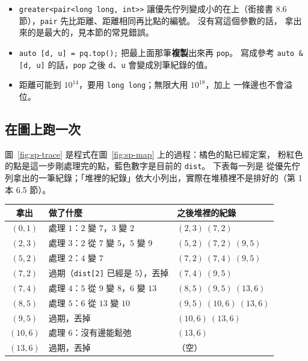 \begin{itemize}
\item \texttt{greater<pair<long long, int>>} 讓優先佇列變成小的在上（銜接書
8.6 節），\texttt{pair} 先比距離、距離相同再比點的編號。 沒有寫這個參數的話，
拿出來的是最大的，見本節的常見錯誤。
\item \texttt{auto [d, u] = pq.top();} 把最上面那筆\textbf{複製}出來再
\texttt{pop}。 寫成參考 \texttt{auto \&[d, u]} 的話，\texttt{pop} 之後
\texttt{d}、\texttt{u} 會變成別筆紀錄的值。
\item 距離可能到 $10^{14}$，要用 \texttt{long long}；無限大用 $10^{18}$，加上
一條邊也不會溢位。
\end{itemize}

\subsection{在圖上跑一次}

圖~\ref{fig:sp-trace} 是程式在圖~\ref{fig:sp-map} 上的過程：橘色的點已經定案，
粉紅色的點是這一步剛處理完的點，藍色數字是目前的 \texttt{dist}。 下表每一列是
從優先佇列拿出的一筆紀錄；「堆裡的紀錄」依大小列出，實際在堆積裡不是排好的（第
1 本 6.5 節）。

\begin{center}
\begin{tabular}{cll}
\toprule
拿出 & 做了什麼 & 之後堆裡的紀錄 \\
\midrule
$(0, 1)$ & 處理 $1$：$2$ 變 $7$，$3$ 變 $2$ & $(2,3)\ (7,2)$ \\
$(2, 3)$ & 處理 $3$：$2$ 從 $7$ 變 $5$，$5$ 變 $9$ & $(5,2)\ (7,2)\ (9,5)$ \\
$(5, 2)$ & 處理 $2$：$4$ 變 $7$ & $(7,2)\ (7,4)\ (9,5)$ \\
$(7, 2)$ & 過期（\texttt{dist[2]} 已經是 $5$），丟掉 & $(7,4)\ (9,5)$ \\
$(7, 4)$ & 處理 $4$：$5$ 從 $9$ 變 $8$，$6$ 變 $13$ & $(8,5)\ (9,5)\ (13,6)$ \\
$(8, 5)$ & 處理 $5$：$6$ 從 $13$ 變 $10$ & $(9,5)\ (10,6)\ (13,6)$ \\
$(9, 5)$ & 過期，丟掉 & $(10,6)\ (13,6)$ \\
$(10, 6)$ & 處理 $6$：沒有邊能鬆弛 & $(13,6)$ \\
$(13, 6)$ & 過期，丟掉 & （空） \\
\bottomrule
\end{tabular}
\end{center}


